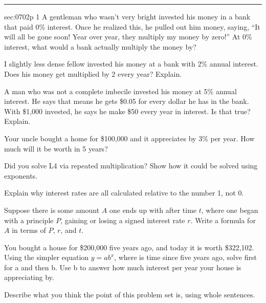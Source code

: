 \renewcommand{\columnseprule}{1.5pt}
\begin{multicols*}{2}
\rule[0.5\baselineskip]{0.4\textwidth}{1pt}
\noindent
{}\label{sec:0702p}
\begin{exercises}{sec:0702p}
\lab{} 1  A gentleman who wasn’t very bright invested his money in a bank that paid 0\% interest.  Once he realized this, he pulled out him money, saying, ``It will all be gone soon!  Year over year, they multiply my money by zero!”  At 0\% interest, what would a bank actually multiply the money by?


\vspace{2cm}
\lab{} I slightly less dense fellow invested his money at a bank with 2\% annual  interest.  Does his money get multiplied by 2 every year?  Explain.


\vspace{3cm}
\lab{}  A man who was not a complete imbecile invested his money at 5\% annual interest.  He says that means he gets \$0.05 for every dollar he has in the bank.  With \$1,000 invested, he says he make \$50 every year in interest.  Is that true?  Explain.

\vspace{2cm}
\lab{} Your uncle bought a home for \$100,000 and it appreciates by 3\% per year.  How much will it be worth in 5 years?


\vspace{2cm}
\lab{} Did you solve L4 via repeated multiplication?  Show how it could be solved using exponents.


\vspace{3cm}
\lab{} Explain why interest rates are all calculated relative to the number 1, not 0.

\vspace{3cm}
\lab{} Suppose there is some amount $A$ one ends up with after time $t$, where one began with a principle $P$, gaining or losing a signed interest rate $r$.  Write a formula for $A$ in terms of $P$, $r$, and $t$.


\vspace{3cm}
\lab{} You bought a house for \$200,000 five years ago, and today it is worth \$322,102.  Using the simpler equation $y=ab^x$, where is time since five years ago, solve first for a and then b.  Use b to answer how much interest per year your house is appreciating by.

\vspace{4cm}
\lab{}  Describe what you think the point of this problem set is, using whole sentences.
\end{exercises}
\end{multicols*}